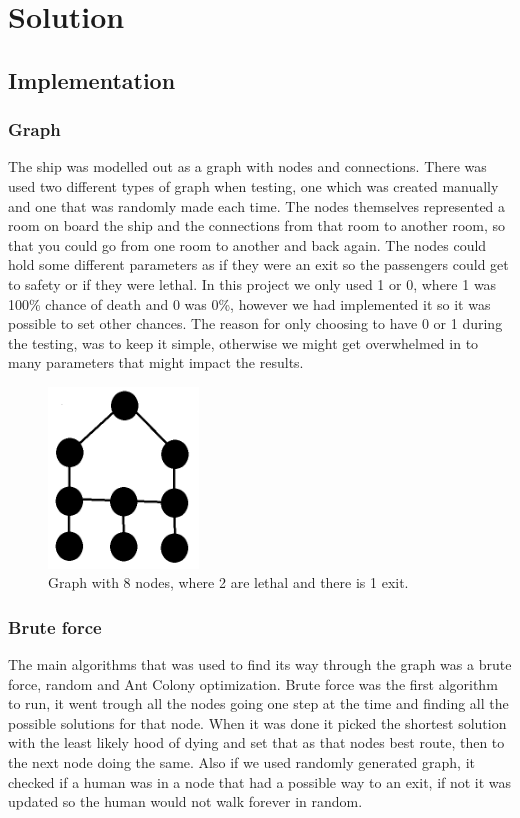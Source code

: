 \chapter{Solution}
\label{ch:solution}


\section{Implementation}

\subsection{Graph}
The ship was modelled out as a graph with nodes and connections. There was used two different types of graph when testing, one which was created manually and one that was randomly made each time. The nodes themselves represented a room on board the ship and the connections from that room to another room, so that you could go from one room to another and back again. The nodes could hold some different parameters as if they were an exit so the passengers could get to safety or if they were lethal. In this project we only used 1 or 0, where 1 was 100\% chance of death and 0 was 0\%, however we had implemented it so it was possible to set other chances. The reason for only choosing to have 0 or 1 during the testing, was to keep it simple, otherwise we might get overwhelmed in to many parameters that might impact the results. 
\begin{figure} %
\includegraphics[width=40mm]{manuallyGraph.png}
\caption{Graph with 8 nodes, where 2 are lethal and there is 1 exit.}
\label{smalgraph}
\end{figure}

\subsection{Brute force}
The main algorithms that was used to find its way through the graph was a brute force, random and Ant Colony optimization. Brute force was the first algorithm to run, it went trough all the nodes going one step at the time and finding all the possible solutions for that node. When it was done it picked the shortest solution with the least likely hood of dying and set that as that nodes best route, then to the next node doing the same. Also if we used randomly generated graph, it checked if a human was in a node that had a possible way to an exit, if not it was updated so the human would not walk forever in random. 

